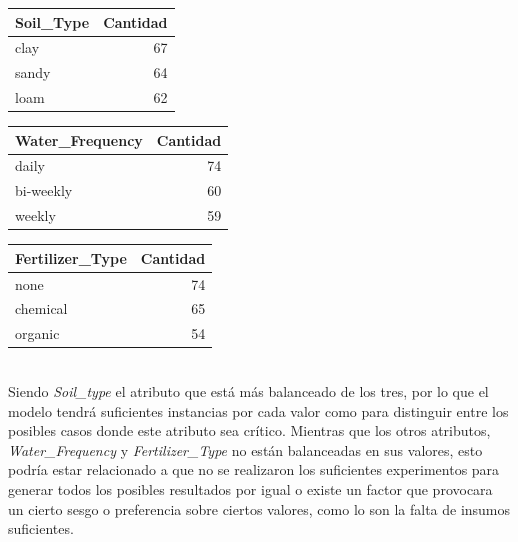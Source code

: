 \documentclass[12pt,a4paper]{article}
\begin{document}
{{            \begin{minipage}{0.5\textwidth}
                \centering
                \begin{tabular}{lr}
                    \toprule
                        {Soil\_Type} & {Cantidad} \\
                    \midrule
                        clay & 67 \\
                        sandy & 64 \\
                        loam & 62 \\
                    \bottomrule
                \end{tabular}
            \end{minipage}%
            \begin{minipage}{0.5\textwidth}
                \centering
                \begin{tabular}{lr}
                    \toprule
                        {Water\_Frequency} & {Cantidad} \\
                    \midrule
                        daily & 74 \\
                        bi-weekly & 60 \\
                        weekly & 59 \\
                    \bottomrule
                \end{tabular}
            \end{minipage}%

            \begin{minipage}{\textwidth}
                \centering
                \begin{tabular}{lr}
                    \toprule
                        {Fertilizer\_Type} & {Cantidad} \\
                    \midrule
                        none & 74 \\
                        chemical & 65 \\
                        organic & 54 \\
                    \bottomrule
                \end{tabular}
            \end{minipage}\\

            Siendo \emph{Soil\_type} el atributo que está más balanceado de los tres, por lo que 
            el modelo tendrá suficientes instancias por cada valor como para distinguir entre los 
            posibles casos donde este atributo sea crítico. Mientras que los otros atributos, \emph{Water\_Frequency} 
            y \emph{Fertilizer\_Type} no están balanceadas en sus valores, esto podría estar 
            relacionado a que no se realizaron los suficientes experimentos para generar todos los 
            posibles resultados por igual o existe un factor que provocara un cierto sesgo o preferencia 
            sobre ciertos valores, como lo son la falta de insumos suficientes.

}}
\end{document}
